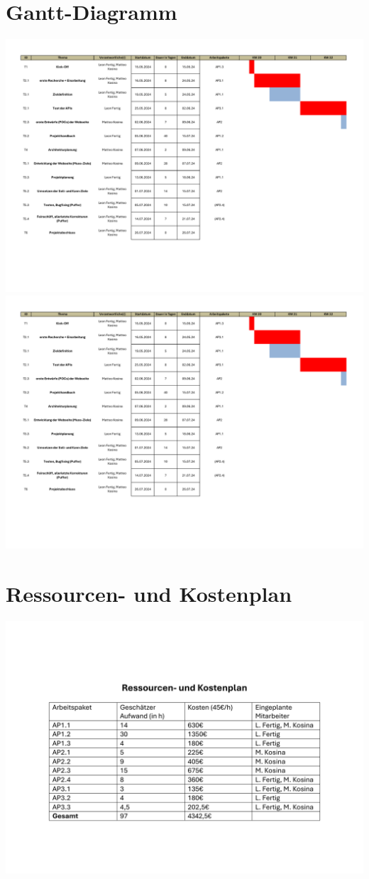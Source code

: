 \documentclass[12pt]{article}
\begin{document}
\section{Gantt-Diagramm}
\includegraphics[width=\textwidth, page=1]{Planungsdokumente/graphics/Gantt_Diagramm.pdf}
\includegraphics[width=\textwidth, page=2]{Planungsdokumente/graphics/Gantt_Diagramm.pdf}

\section{Ressourcen- und Kostenplan}
\includegraphics[width=\textwidth]{Planungsdokumente/graphics/Ressourcenplan.pdf}
\end{document}
